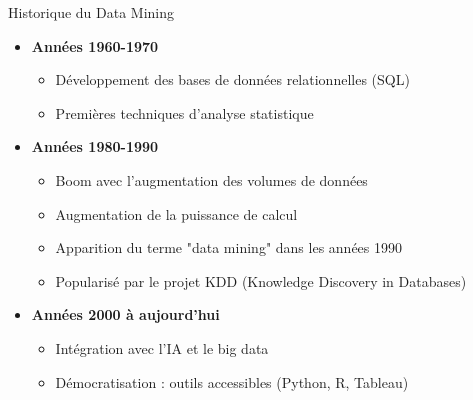 \begin{frame}{Historique du Data Mining}

\begin{itemize}
    \item<+-> \textbf{Années 1960-1970}
        \begin{itemize}
            \item Développement des bases de données relationnelles (SQL)
            \item Premières techniques d'analyse statistique
        \end{itemize}

    \vspace{0.2cm}
    \item<+-> \textbf{Années 1980-1990}
        \begin{itemize}
            \item Boom avec l'augmentation des volumes de données
            \item Augmentation de la puissance de calcul
            \item Apparition du terme "data mining" dans les années 1990
            \item Popularisé par le projet KDD (Knowledge Discovery in Databases)
        \end{itemize}

    \vspace{0.2cm}
    \item<+-> \textbf{Années 2000 à aujourd'hui}
        \begin{itemize}
            \item Intégration avec l'IA et le big data
            \item Démocratisation : outils accessibles (Python, R, Tableau)
        \end{itemize}
\end{itemize}

\end{frame}

